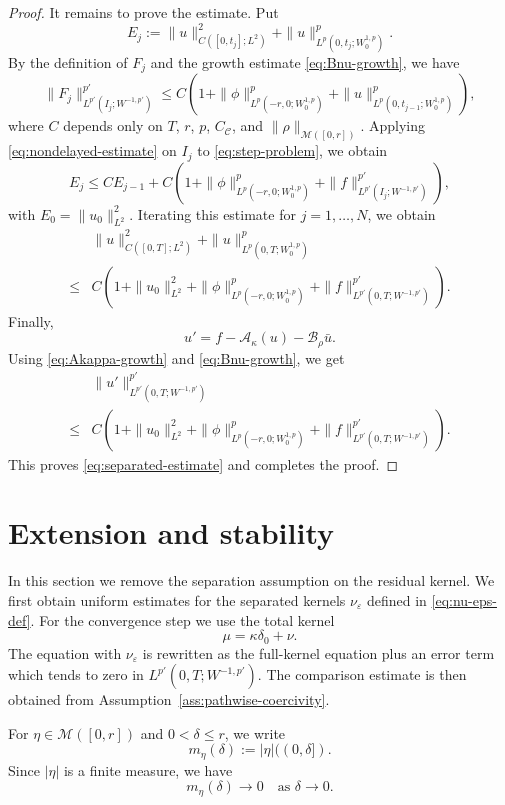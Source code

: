 \documentclass[a4paper,11pt,oneside,reqno]{amsart}
\newcounter{c}
\newcounter{d}
\newcounter{b}
\newcommand{\e}{\varepsilon}
\newcommand{\M}{\mathcal{M}}
\begin{document}
\begin{proof}
It remains to prove the estimate.  Put
\[
 E_j:=
 \|u\|_{C([0,t_j];L^2)}^2
 +
 \|u\|_{L^p(0,t_j;W^{1,p}_0)}^p.
\]
By the definition of \(F_j\) and the growth estimate
\eqref{eq:Bnu-growth}, we have
\[
 \|F_j\|_{L^{p'}(I_j;W^{-1,p'})}^{p'}
 \le
 C\left(
 1+\|\phi\|_{L^p(-r,0;W^{1,p}_0)}^p
  +\|u\|_{L^p(0,t_{j-1};W^{1,p}_0)}^p
 \right),
\]
where \(C\) depends only on \(T\), \(r\), \(p\), \(C_{\mathcal C}\), and
\(\|\rho\|_{\M([0,r])}\). Applying
\eqref{eq:nondelayed-estimate} on \(I_j\) to
\eqref{eq:step-problem}, we obtain
\[
 E_j
 \le
 C E_{j-1}
 +C\left(
 1+\|\phi\|_{L^p(-r,0;W^{1,p}_0)}^p
  +\|f\|_{L^{p'}(I_j;W^{-1,p'})}^{p'}
 \right),
\]
with \(E_0=\|u_0\|_{L^2}^2\). Iterating this estimate for \(j=1,\dots,N\), we obtain
\[
\begin{aligned}
 &\|u\|_{C([0,T];L^2)}^2
 +\|u\|_{L^p(0,T;W^{1,p}_0)}^p \\
\le{}&
 C\left(
 1+\|u_0\|_{L^2}^2
 +\|\phi\|_{L^p(-r,0;W^{1,p}_0)}^p
 +\|f\|_{L^{p'}(0,T;W^{-1,p'})}^{p'}
 \right).
\end{aligned}
\]
Finally,
\[
 u'=f-\mathcal A_\kappa(u)-\mathcal B_\rho\bar u.
\]
Using \eqref{eq:Akappa-growth} and \eqref{eq:Bnu-growth}, we get
\[
\begin{aligned}
 &\|u'\|_{L^{p'}(0,T;W^{-1,p'})}^{p'} \\
 \le{}&
 C\left(
 1+\|u_0\|_{L^2}^2
 +\|\phi\|_{L^p(-r,0;W^{1,p}_0)}^p
 +\|f\|_{L^{p'}(0,T;W^{-1,p'})}^{p'}
 \right).
\end{aligned}
\]
This proves \eqref{eq:separated-estimate} and completes the proof.
\end{proof}



\section{Extension and stability}\label{sec:extension}

In this section we remove the separation assumption on the residual kernel.
We first obtain uniform estimates for the separated kernels \(\nu_\e\)
defined in \eqref{eq:nu-eps-def}. For the convergence step we use the total kernel
\[
 \mu=\kappa\delta_0+\nu .
\]
The equation with \(\nu_\e\) is rewritten as the full-kernel equation plus an
error term which tends to zero in \(L^{p'}(0,T;W^{-1,p'})\). The comparison
estimate is then obtained from Assumption~\ref{ass:pathwise-coercivity}.

For \(\eta\in\M([0,r])\) and \(0<\delta\le r\), we write
\[
 m_\eta(\delta):=|\eta|((0,\delta]).
\]
Since \(|\eta|\) is a finite measure, we have
\[
 m_\eta(\delta)\to0
 \quad\text{as }\delta\to0 .
\]
\end{document}
